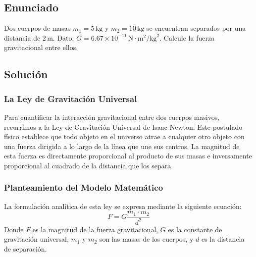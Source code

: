 \documentclass[12pt]{article}
\begin{document}
\newpage

\subsection*{Enunciado}
Dos cuerpos de masas $m_1 = 5 \, \text{kg}$ y $m_2 = 10 \, \text{kg}$ se encuentran separados por una distancia de $2 \, \text{m}$. Dato: $G = 6.67 \times 10^{-11} \, \text{N}\cdot\text{m}^2/\text{kg}^2$. Calcule la fuerza gravitacional entre ellos.

\subsection*{Solución}

\subsubsection*{La Ley de Gravitación Universal}
Para cuantificar la interacción gravitacional entre dos cuerpos masivos, recurrimos a la Ley de Gravitación Universal de Isaac Newton. Este postulado físico establece que todo objeto en el universo atrae a cualquier otro objeto con una fuerza dirigida a lo largo de la línea que une sus centros. La magnitud de esta fuerza es directamente proporcional al producto de sus masas e inversamente proporcional al cuadrado de la distancia que los separa.

\subsubsection*{Planteamiento del Modelo Matemático}
La formulación analítica de esta ley se expresa mediante la siguiente ecuación:
\begin{equation}
    F = G \frac{m_1 \cdot m_2}{d^2}
\end{equation}
Donde $F$ es la magnitud de la fuerza gravitacional, $G$ es la constante de gravitación universal, $m_1$ y $m_2$ son las masas de los cuerpos, y $d$ es la distancia de separación.
\end{document}
